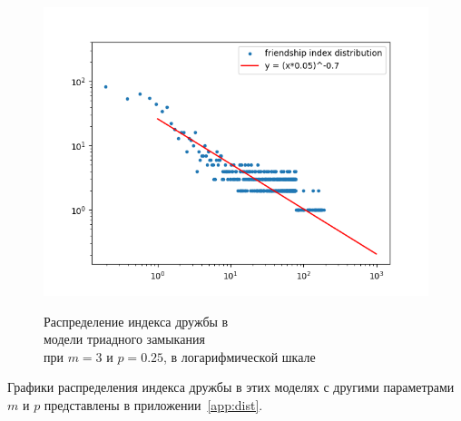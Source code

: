\documentclass[bachelor, och, diploma]{SCWorks}
\begin{document}
\begin{figure}[!ht]
\centering
\includegraphics[scale=0.7]{diploma_results/static_log/triad_dist_beta_3_0.25.png}\\
\caption{Распределение индекса дружбы  в\\ модели триадного замыкания\\ при $m=3$ и $ p=0.25 $, в логарифмической шкале}\label{fig:triadsl3}
\end{figure}

Графики распределения индекса дружбы в этих моделях с другими параметрами $ m $ и $ p $ представлены в приложении~\ref{app:dist}.
\end{document}
